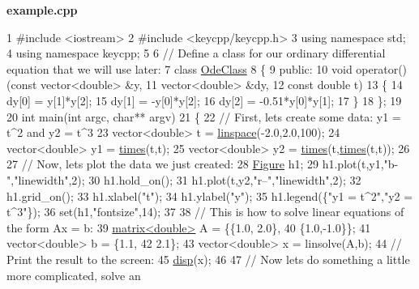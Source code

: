 {\bfseries {\ttfamily example.\-cpp}} 
\begin{DoxyCodeInclude}
1 \textcolor{preprocessor}{#include <iostream>}
2 \textcolor{preprocessor}{#include <keycpp/keycpp.h>}
3 \textcolor{keyword}{using namespace }std;
4 \textcolor{keyword}{using namespace }keycpp;
5 
6 \textcolor{comment}{// Define a class for our ordinary differential equation that we will use later:}
7 \textcolor{keyword}{class }\hyperlink{class_ode_class}{OdeClass}
8 \{
9     \textcolor{keyword}{public}:
10         \textcolor{keywordtype}{void} operator()(\textcolor{keyword}{const} vector<double> &y,
11                         vector<double> &dy,
12                         \textcolor{keyword}{const} \textcolor{keywordtype}{double} t)
13         \{
14             dy[0] = y[1]*y[2];
15             dy[1] = -y[0]*y[2];
16             dy[2] = -0.51*y[0]*y[1];
17         \}
18 \};
19 
20 \textcolor{keywordtype}{int} main(\textcolor{keywordtype}{int} argc, \textcolor{keywordtype}{char}** argv)
21 \{
22     \textcolor{comment}{// First, lets create some data: y1 = t^2 and y2 = t^3}
23     vector<double> t = \hyperlink{namespacekeycpp_a4e8769de1f22713d3564350d53125b26}{linspace}(-2.0,2.0,100);
24     vector<double> y1 = \hyperlink{namespacekeycpp_ac1ff99e34619478096c271b38df1f3d7}{times}(t,t);
25     vector<double> y2 = \hyperlink{namespacekeycpp_ac1ff99e34619478096c271b38df1f3d7}{times}(t,\hyperlink{namespacekeycpp_ac1ff99e34619478096c271b38df1f3d7}{times}(t,t));
26 
27     \textcolor{comment}{// Now, lets plot the data we just created:}
28     \hyperlink{classkeycpp_1_1_figure}{Figure} h1;
29     h1.plot(t,y1,\textcolor{stringliteral}{"b-"},\textcolor{stringliteral}{"linewidth"},2);
30     h1.hold\_on();
31     h1.plot(t,y2,\textcolor{stringliteral}{"r--"},\textcolor{stringliteral}{"linewidth"},2);
32     h1.grid\_on();
33     h1.xlabel(\textcolor{stringliteral}{"t"});
34     h1.ylabel(\textcolor{stringliteral}{"y"});
35     h1.legend(\{\textcolor{stringliteral}{"y1 = t^2"},\textcolor{stringliteral}{"y2 = t^3"}\});
36     \textcolor{keyword}{set}(h1,\textcolor{stringliteral}{"fontsize"},14);
37 
38     \textcolor{comment}{// This is how to solve linear equations of the form Ax = b:}
39     \hyperlink{classkeycpp_1_1matrix}{matrix<double>} A = \{\{1.0, 2.0\},
40                         \{1.0,-1.0\}\};
41     vector<double> b = \{1.1,
42                         2.1\};
43     vector<double> x = linsolve(A,b);
44     \textcolor{comment}{// Print the result to the screen:}
45     \hyperlink{namespacekeycpp_a6a8a286886d48471685b18b7782f1e4a}{disp}(x);
46 
47     \textcolor{comment}{// Now lets do something a little more complicated, solve an}

\end{DoxyCodeInclude}
